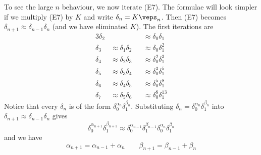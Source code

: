 To see the large $n$ behaviour, we now iterate (E7). The formulae will look simpler if we multiply (E7) by $K$ and write $\delta_n=K\veps_n$.
Then (E7) becomes $\delta_{n+1}\approx\delta_{n-1}\delta_n$ (and we have eliminated $K$). 
The first iterations are
\begin{alignat*}{3}
\delta_2&& &\approx \delta_0\delta_1 \\
\delta_3&\approx \delta_1\delta_2 
       &&\approx \delta_0\delta_1^2 \\
\delta_4&\approx \delta_2\delta_3 
       &&\approx \delta_0^2\delta_1^3 \\
\delta_5&\approx \delta_3\delta_4 
       &&\approx \delta_0^3\delta_1^5 \\
\delta_6&\approx \delta_4\delta_5 
       &&\approx \delta_0^5\delta_1^8 \\
\delta_7&\approx \delta_5\delta_6 
       &&\approx \delta_0^8\delta_1^{13}
\end{alignat*}
Notice that every $\delta_n$ is of the form 
                $\delta_0^{\alpha_n}\delta_1^{\beta_n}$.
Substituting $\delta_n=\delta_0^{\alpha_n}\delta_1^{\beta_n}$ into $\delta_{n+1}\approx\delta_{n-1}\delta_n$ gives
\begin{equation*}
\delta_0^{\alpha_{n+1}}\delta_1^{\beta_{n+1}} 
           \approx \delta_0^{\alpha_{n-1}}\delta_1^{\beta_{n-1}}
                               \delta_0^{\alpha_n}\delta_1^{\beta_n}
\end{equation*}
and we have
\begin{equation*}
\alpha_{n+1}=\alpha_{n-1}+\alpha_{n} \qquad
\beta_{n+1}=\beta_{n-1}+\beta_{n} 
\tag{E8}\end{equation*}

